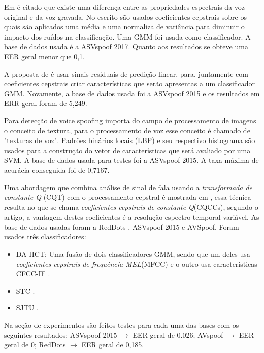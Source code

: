 \begin{myenv}{1.5}
		\par Em \cite{8725688} é citado que existe uma diferença entre as propriedades espectrais da voz original e da voz gravada. No escrito são usados coeficientes cepstrais sobre os quais são aplicados uma média e uma normaliza de variância para diminuir o impacto dos ruídos na classificação. Uma GMM foi usada como classificador. A base de dados usada é a ASVspoof 2017. Quanto aos resultados se obteve uma EER geral menor que 0,1.
	
		\par A proposta de \cite{Hanilci2018} é usar sinais residuais de predição linear, para, juntamente com coeficientes cepstrais criar características que serão apresentas a um classificador GMM. Novamente, a base de dados usada foi a ASVspoof 2015 e os resultados em ERR geral foram de 5,249.

		\par Para detecção de voice spoofing  \cite{ISI:000473343500086} importa do campo de processamento de imagens o conceito de textura, para o processamento de voz esse conceito é chamado de "texturas de voz". Padrões binários locais (LBP) e seu respectivo histograma são usados para a construção do vetor de características que será avaliado por uma SVM. A base de dados usada para testes foi a ASVspoof 2015. A taxa máxima de acurácia conseguida foi de 0,7167.
		
		\par Uma abordagem que combina análise de sinal de fala usando a \textit{transformada de constante Q} (CQT) com o processamento cepstral é mostrada em \cite{TODISCO2017516}, essa técnica resulta no que se chama \textit{coeficientes cepstrais de constante Q}(CQCCs), segundo o artigo, a vantagem destes coeficientes é a resolução espectro temporal variável. As base de dados usadas foram a RedDots \cite{redDots}, ASVspoof 2015 e AVSpoof. Foram usados três classificadores:
		\begin{itemize}
			\item DA-IICT: Uma fusão de dois classificadores GMM, sendo que um deles usa \textit{coeficientes cepstrais de frequência MEL}(MFCC) e o outro usa características CFCC-IF \cite{Patel2015}.
			\item STC \cite{7472724}.
			\item SJTU \cite{korshunov2016overview}.
		\end{itemize}			
		Na seção de experimentos são feitos testes para cada uma das bases com os seguintes resultados: ASVspoof 2015 $\rightarrow$ EER geral de 0.026; AVspoof $\rightarrow$ EER geral de 0; RedDots $\rightarrow$ EER geral de 0,185.


\end{myenv}
